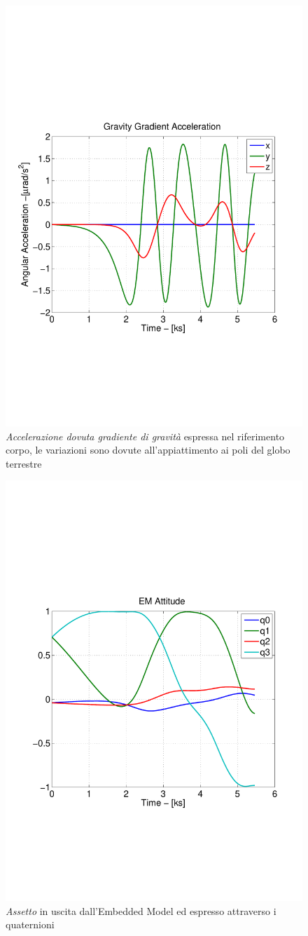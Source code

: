 \begin{figure}
	\includegraphics[width=.6\textwidth,clip=true,trim=1cm
	6cm
	1cm
	8cm]{modelling/attitude_kinematics_and_dynamics/image/GravityGradientAcceleration.pdf}
	\caption{\emph{Accelerazione dovuta gradiente di gravità} espressa nel
	riferimento corpo, le variazioni sono dovute all'appiattimento ai poli del
	globo terrestre}
	\label{fig:gravity-acceleration}
\end{figure}

\begin{figure}
	\includegraphics[width=.6\textwidth,clip=true,trim=1cm
	6cm
	1cm
	8cm]{modelling/attitude_kinematics_and_dynamics/image/EMAttitude.pdf}
	\caption{\emph{Assetto} in uscita dall'Embedded Model ed  espresso attraverso
	i quaternioni}
	\label{fig:attitude}
\end{figure}